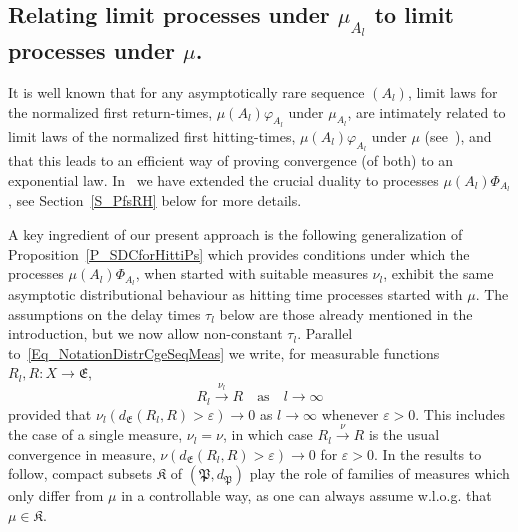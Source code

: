 \documentclass[10pt]{amsart}
\theoremstyle{definition}\newtheorem{defi}[theo]{Definition}\newtheorem{rema}[theo]{Remark}\newtheorem{exam}[theo]{Example}\newtheorem{exem}[theo]{Example}\newtheorem{nota}[theo]{Notation}
\newcommand{\frkK}{\mathfrak{K}}
\newcommand{\frkP}{\mathfrak{P}}
\newcommand{\frkE}{\mathfrak{E}}
\begin{document}
\subsection{Relating limit processes under $\mu_{A_{l}}$ to limit processes under $\mu$.}
It is well known that for any asymptotically rare sequence $(A_{l})$, limit laws for the normalized first return-times, $\mu(A_{l})\varphi_{A_{l}}$ under $\mu_{A_{l}}$, are intimately related to limit laws of the normalized first hitting-times, $\mu(A_{l})\varphi_{A_{l}}$ under $\mu$ (see~\cite{AS,HaydnLacVai05}), and that this leads to an efficient way of proving convergence (of both) to an exponential law. In~\cite{Z11} we have extended the crucial duality to processes $\mu(A_{l})\Phi_{A_{l}}$, see Section~\ref{S_PfsRH} below for more details.

A key ingredient of our present approach is the following generalization of Proposition~\ref{P_SDCforHittiPs} which provides conditions under which the processes $\mu(A_{l})\Phi_{A_{l}}$, when started with suitable measures $\nu_{l}$, exhibit the same asymptotic distributional behaviour as hitting time processes started with $\mu$. The assumptions on the delay times $\tau_{l}$ below are those already mentioned in the introduction, but we now allow non-constant $\tau_{l}$. Parallel to~\eqref{Eq_NotationDistrCgeSeqMeas} we write, for measurable functions $R_{l},R:X\rightarrow\frkE$,
\begin{equation}\label{Eq_NotationProbaCgeSeqMeas}
R_{l}\overset{\nu_{l}}{\longrightarrow}R\quad \text{as}\quad l\rightarrow\infty
\end{equation}
provided that $\nu_{l}(d_{\frkE}(R_{l},R)>\varepsilon)\rightarrow0$ as $l\rightarrow\infty$ whenever $\varepsilon>0$. This includes the case of a single measure, $\nu_{l}=\nu$, in which case $R_{l}\overset{\nu} {\longrightarrow}R$ is the usual convergence in measure, $\nu(d_{\frkE }(R_{l},R)>\varepsilon)\rightarrow0$ for $\varepsilon>0$. In the results to follow, compact subsets $\frkK$ of $(\frkP,d_{\frkP})$ play the role of families of measures which only differ from $\mu$ in a controllable way, as one can always assume w.l.o.g. that $\mu\in\frkK$.
\end{document}
